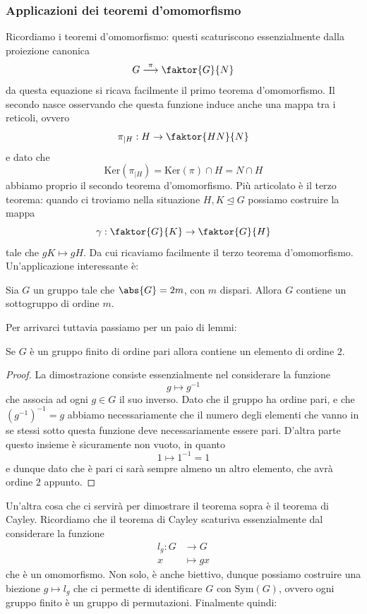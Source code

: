 \documentclass[11pt]{scrartcl}
\renewcommand{\ker}[1]{\text{Ker}\left(#1\right)}
\newcommand{\normal}{\mathrel{\unlhd}}
\begin{document}
	\subsubsection{Applicazioni dei teoremi d'omomorfismo}
	Ricordiamo i teoremi d'omomorfismo: questi scaturiscono essenzialmente dalla proiezione canonica
	$$G\overset{\pi}{\longrightarrow}\faktor{G}{N}$$
	da questa equazione si ricava facilmente il primo teorema d'omomorfismo. Il secondo nasce osservando che questa funzione induce anche una mappa tra i reticoli, ovvero
	$$\pi_{\mid H}:H\to \faktor{HN}{N}$$
	e dato che 
	$$\ker{\pi_{\mid H}}=\ker{\pi}\cap H=N\cap H$$
	abbiamo proprio il secondo teorema d'omomorfismo. Più articolato è il terzo teorema: quando ci troviamo nella situazione $H,K\normal G$ possiamo costruire la mappa
	$$\gamma:\faktor{G}{K}\to \faktor{G}{H}$$
	tale che $gK\mapsto gH$. Da cui ricaviamo facilmente il terzo teorema d'omomorfismo. Un'applicazione interessante è:
	\begin{theorem*}
		Sia $G$ un gruppo tale che $\abs{G}=2m$, con $m$ dispari. Allora $G$ contiene un sottogruppo di ordine $m$.
	\end{theorem*}
	Per arrivarci tuttavia passiamo per un paio di lemmi:
	\begin{lemma}[$2$-Cauchy]
		Se $G$ è un gruppo finito di ordine pari allora contiene un elemento di ordine $2$.
	\end{lemma}
	\begin{proof}
		La dimostrazione consiste essenzialmente nel considerare la funzione
		$$g\mapsto g^{-1}$$
		che associa ad ogni $g\in G$ il suo inverso. Dato che il gruppo ha ordine pari, e che $(g^{-1})^{-1}=g$ abbiamo necessariamente che il numero degli elementi che vanno in se stessi sotto questa funzione deve necessariamente essere pari. D'altra parte questo insieme è sicuramente non vuoto, in quanto
		$$1\mapsto 1^{-1}=1$$
		e dunque dato che è pari ci sarà sempre almeno un altro elemento, che avrà ordine $2$ appunto.
	\end{proof}
	Un'altra cosa che ci servirà per dimostrare il teorema sopra è il teorema di Cayley. Ricordiamo che il teorema di Cayley scaturiva essenzialmente dal considerare la funzione
	\begin{align*}
		l_g:G &\to G \\
		x & \mapsto gx
	\end{align*}
	che è un omomorfismo. Non solo, è anche biettivo, dunque possiamo costruire una biezione $g\mapsto l_g$ che ci permette di identificare $G$ con $\text{Sym}(G)$, ovvero ogni gruppo finito è un gruppo di permutazioni. Finalmente quindi:
\end{document}

